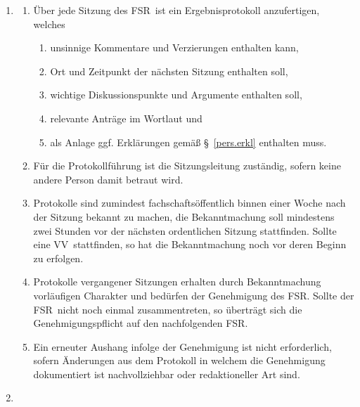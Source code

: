 \documentclass[a4paper, 12pt, ngerman]{article}
\newcommand{\vv}{VV}
\newcommand{\rat}{FSR}
\newcommand{\rates}{FSR}
\begin{document}
\begin{enumerate}[leftmargin=0cm]
	\item {}\label{protokollfuhrung}
	
	\begin{enumerate}[leftmargin=0cm]
		\item Über jede Sitzung des \rates~ist ein Ergebnisprotokoll anzufertigen, welches
		\begin{enumerate}
			\item unsinnige Kommentare und Verzierungen enthalten kann,
			\item Ort und Zeitpunkt der nächsten Sitzung enthalten soll,
			\item wichtige Diskussionspunkte und Argumente enthalten soll,
			\item relevante Anträge im Wortlaut und
			\item als Anlage ggf. Erklärungen gemäß §~\ref{pers.erkl} enthalten muss.
		\end{enumerate}
		\item Für die Protokollführung
		ist die Sitzungsleitung zuständig, sofern keine andere Person damit betraut wird.		
		\item Protokolle sind zumindest fachschaftsöffentlich binnen einer Woche nach der Sitzung bekannt zu machen, die Bekanntmachung soll mindestens zwei Stunden vor der nächsten ordentlichen Sitzung stattfinden. Sollte eine \vv~stattfinden, so hat die Bekanntmachung noch vor deren Beginn zu erfolgen.
		\item Protokolle vergangener Sitzungen erhalten durch Bekanntmachung vorläufigen Charakter und bedürfen der Genehmigung des \rates. Sollte der \rat~nicht noch einmal zusammentreten, so überträgt sich die Genehmigungspflicht auf den nachfolgenden \rat.
		\item Ein erneuter Aushang infolge der Genehmigung ist nicht erforderlich, sofern Änderungen aus dem Protokoll in welchem die Genehmigung dokumentiert ist nachvollziehbar oder redaktioneller Art sind.
	\end{enumerate}

	\item {}\label{pers.erkl}
	

\end{enumerate}
\end{document}
